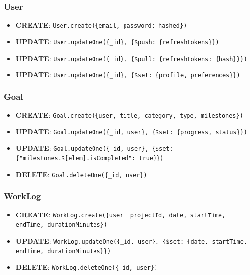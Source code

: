 \documentclass[11pt,a4paper]{article}
\begin{document}
\subsubsection{User}

\begin{itemize}
    \item \textbf{CREATE}: \texttt{User.create(\{email, password: hashed\})}
    \item \textbf{UPDATE}: \texttt{User.updateOne(\{_id\}, \{\$push: \{refreshTokens\}\})}
    \item \textbf{UPDATE}: \texttt{User.updateOne(\{_id\}, \{\$pull: \{refreshTokens: \{hash\}\}\})}
    \item \textbf{UPDATE}: \texttt{User.updateOne(\{_id\}, \{\$set: \{profile, preferences\}\})}
\end{itemize}

\subsubsection{Goal}

\begin{itemize}
    \item \textbf{CREATE}: \texttt{Goal.create(\{user, title, category, type, milestones\})}
    \item \textbf{UPDATE}: \texttt{Goal.updateOne(\{_id, user\}, \{\$set: \{progress, status\}\})}
    \item \textbf{UPDATE}: \texttt{Goal.updateOne(\{_id, user\}, \{\$set: \{"milestones.\$[elem].isCompleted": true\}\})}
    \item \textbf{DELETE}: \texttt{Goal.deleteOne(\{_id, user\})}
\end{itemize}

\subsubsection{WorkLog}

\begin{itemize}
    \item \textbf{CREATE}: \texttt{WorkLog.create(\{user, projectId, date, startTime, endTime, durationMinutes\})}
    \item \textbf{UPDATE}: \texttt{WorkLog.updateOne(\{_id, user\}, \{\$set: \{date, startTime, endTime, durationMinutes\}\})}
    \item \textbf{DELETE}: \texttt{WorkLog.deleteOne(\{_id, user\})}
\end{itemize}
\end{document}
